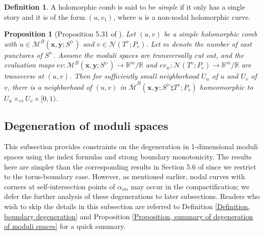 \documentclass{amsart}
\newtheorem{prop}[thm]{Proposition}
\theoremstyle{definition}
\newtheorem{defn}[thm]{Definition}
\theoremstyle{remark}
\numberwithin{equation}{section}
\numberwithin{equation}{section} \makeatletter
\begin{document}
\begin{defn}
	A holomorphic comb is said to be \emph{simple} if it only has a single story and it is of the form $(u,v_1)$, where $u$ is a non-nodal holomorphic curve.
\end{defn}

\begin{prop}[Proposition 5.31 of \cite{LOT18}]\label{Proposition, gluing holomorphic curves and east ends}
Let $(u,v)$ be a simple holomorphic comb with $u\in \mathcal{M}^{B}(\bm{x},\bm{y};S^\triangleright)$ and $v\in \mathcal{N}(T^\diamond;P_e)$. Let $m$ denote the number of east punctures of $S^\triangleright$. Assume the moduli spaces are transversally cut out, and the evaluation maps $ev:\mathcal{M}^{B}(\bm{x},\bm{y};S^\triangleright)\rightarrow \mathbb{R}^m/\mathbb{R}$ and $ev_w: \mathcal{N}(T^\diamond;P_e)\rightarrow \mathbb{R}^m/\mathbb{R}$ are transverse at $(u,v)$. Then for sufficiently small neighborhood $U_u$ of $u$ and $U_v$ of $v$, there is a neighborhood of $(u,v)$ in $\overline{\mathcal{M}}^{B}(\bm{x},\bm{y};S^\triangleright\natural T^\diamond; P_e)$ homeomorphic to $U_u\times_{ev} U_v \times [0,1)$.
\end{prop}

\subsection{Degeneration of moduli spaces}\label{Section, degeneration of moduli space}
This subsection provides constraints on the degeneration in 1-dimensional moduli spaces using the index formulas and strong boundary monotonicity. The results here are simpler than the corresponding results in Section 5.6 of \cite{LOT18} since we restrict to the torus-boundary case. However, as mentioned earlier, nodal curves with corners at self-intersection points of $\alpha_{im}$ may occur in the compactification; we defer the further analysis of these degenerations to later subsections. Readers who wish to skip the details in this subsection are referred to Definition \ref{Definition, boundary degeneration} and Proposition \ref{Proposition, summary of degeneration of moduli spaces} for a quick summary.
\end{document}
